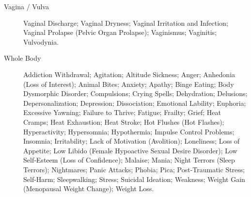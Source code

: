 \begin{description}
  \item[Vagina / Vulva] Vaginal Discharge; Vaginal Dryness; Vaginal Irritation and Infection; Vaginal Prolapse (Pelvic Organ Prolapse); Vaginismus; Vaginitis; Vulvodynia.
  \item[Whole Body] Addiction Withdrawal; Agitation; Altitude Sickness; Anger; Anhedonia (Loss of Interest); Animal Bites; Anxiety; Apathy; Binge Eating; Body Dysmorphic Disorder; Compulsions; Crying Spells; Dehydration; Delusions; Depersonalization; Depression; Dissociation; Emotional Lability; Euphoria; Excessive Yawning; Failure to Thrive; Fatigue; Frailty; Grief; Heat Cramps; Heat Exhaustion; Heat Stroke; Hot Flushes (Hot Flashes); Hyperactivity; Hypersomnia; Hypothermia; Impulse Control Problems; Insomnia; Irritability; Lack of Motivation (Avolition); Loneliness; Loss of Appetite; Low Libido (Female Hypoactive Sexual Desire Disorder); Low Self-Esteem (Loss of Confidence); Malaise; Mania; Night Terrors (Sleep Terrors); Nightmares; Panic Attacks; Phobia; Pica; Post-Traumatic Stress; Self-Harm; Sleepwalking; Stress; Suicidal Ideation; Weakness; Weight Gain (Menopausal Weight Change); Weight Loss.
\end{description}
